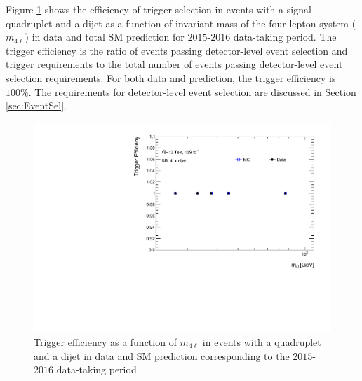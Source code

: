 Figure \ref{fig:Trigger} shows the efficiency of trigger selection in events with a signal quadruplet and a dijet as a function of invariant mass of the four-lepton system ($m_{4\ell}$) in data and total SM prediction for $2015$-$2016$ data-taking period. The trigger efficiency is the ratio of events passing detector-level event selection and trigger requirements to the total number of events passing detector-level event selection requirements. For both data and prediction, the trigger efficiency is $100\%$. The requirements for detector-level event selection are discussed in Section \ref{sec:EventSel}.

\begin{figure}[!htb]
    \centering
    \includegraphics[width=.8\linewidth]{figures/AnalysisOverview/TriggerEfficiency_DataMC.pdf}
    \caption{ Trigger efficiency as a function of $m_{4\ell}$ in events with a quadruplet and a dijet in data and SM prediction corresponding to the $2015$-$2016$ data-taking period.\label{fig:Trigger}}
\end{figure}